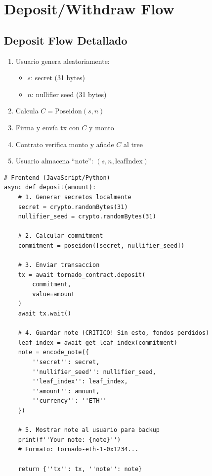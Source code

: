 \documentclass[11pt,a4paper,twoside]{book}
\begin{document}
\section{Deposit/Withdraw Flow}

\subsection{Deposit Flow Detallado}

\begin{enumerate}
    \item Usuario genera aleatoriamente:
    \begin{itemize}
        \item $s$: secret (31 bytes)
        \item $n$: nullifier seed (31 bytes)
    \end{itemize}
    \item Calcula $C = \text{Poseidon}(s, n)$
    \item Firma y env\'ia tx con $C$ y monto
    \item Contrato verifica monto y a\~nade $C$ al tree
    \item Usuario almacena ``note'': $(s, n, \text{leafIndex})$
\end{enumerate}

\begin{example}
\begin{lstlisting}[style=python]
# Frontend (JavaScript/Python)
async def deposit(amount):
    # 1. Generar secretos localmente
    secret = crypto.randomBytes(31)
    nullifier_seed = crypto.randomBytes(31)
    
    # 2. Calcular commitment
    commitment = poseidon([secret, nullifier_seed])
    
    # 3. Enviar transaccion
    tx = await tornado_contract.deposit(
        commitment,
        value=amount
    )
    await tx.wait()
    
    # 4. Guardar note (CRITICO! Sin esto, fondos perdidos)
    leaf_index = await get_leaf_index(commitment)
    note = encode_note({
        ''secret'': secret,
        ''nullifier_seed'': nullifier_seed,
        ''leaf_index'': leaf_index,
        ''amount'': amount,
        ''currency'': ''ETH''
    })
    
    # 5. Mostrar note al usuario para backup
    print(f''Your note: {note}'')
    # Formato: tornado-eth-1-0x1234...
    
    return {''tx'': tx, ''note'': note}
\end{lstlisting}
\end{example}
\end{document}

